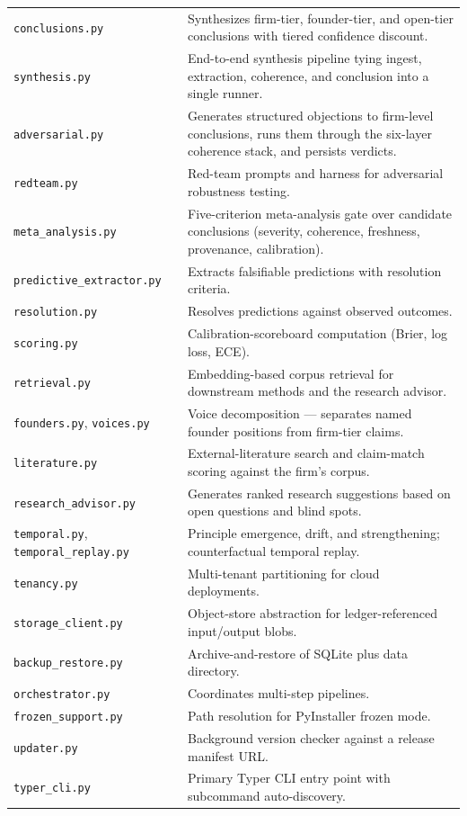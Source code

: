 \documentclass[11pt,letterpaper]{article}
\newcommand{\mod}[1]{\texttt{#1}}
\begin{document}
\begin{longtable}{p{3.6cm} p{10.9cm}}
\mod{conclusions.py}        & Synthesizes firm-tier, founder-tier, and open-tier conclusions with tiered confidence discount. \\
\mod{synthesis.py}          & End-to-end synthesis pipeline tying ingest, extraction, coherence, and conclusion into a single runner. \\
\mod{adversarial.py}        & Generates structured objections to firm-level conclusions, runs them through the six-layer coherence stack, and persists verdicts. \\
\mod{redteam.py}            & Red-team prompts and harness for adversarial robustness testing. \\
\mod{meta\_analysis.py}     & Five-criterion meta-analysis gate over candidate conclusions (severity, coherence, freshness, provenance, calibration). \\
\mod{predictive\_extractor.py} & Extracts falsifiable predictions with resolution criteria. \\
\mod{resolution.py}         & Resolves predictions against observed outcomes. \\
\mod{scoring.py}            & Calibration-scoreboard computation (Brier, log loss, ECE). \\
\mod{retrieval.py}          & Embedding-based corpus retrieval for downstream methods and the research advisor. \\
\mod{founders.py}, \mod{voices.py}           & Voice decomposition --- separates named founder positions from firm-tier claims. \\
\mod{literature.py}         & External-literature search and claim-match scoring against the firm's corpus. \\
\mod{research\_advisor.py}  & Generates ranked research suggestions based on open questions and blind spots. \\
\mod{temporal.py}, \mod{temporal\_replay.py} & Principle emergence, drift, and strengthening; counterfactual temporal replay. \\
\mod{tenancy.py}            & Multi-tenant partitioning for cloud deployments. \\
\mod{storage\_client.py}    & Object-store abstraction for ledger-referenced input/output blobs. \\
\mod{backup\_restore.py}    & Archive-and-restore of SQLite plus data directory. \\
\mod{orchestrator.py}       & Coordinates multi-step pipelines. \\
\mod{frozen\_support.py}    & Path resolution for PyInstaller frozen mode. \\
\mod{updater.py}            & Background version checker against a release manifest URL. \\
\mod{typer\_cli.py}         & Primary Typer CLI entry point with subcommand auto-discovery. \\
\bottomrule
\end{longtable}
\end{document}
